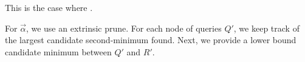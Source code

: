 \documentclass{article}
\newtheorem{theorem}{Theorem}
\newtheorem{definition} {Definition}
\newcommand{\GNP}[1][\psi]{{#1}_{\Theta}}
\newcommand{\vecalpha}{\vec{\alpha}}
\begin{document}
\noindent This is the case where .

For $\vecalpha$, we use an extrinsic prune.
For each node of queries $Q'$, we keep track of the largest candidate second-minimum found.
Next, we provide a lower bound candidate minimum between $Q'$ and $R'$.


\appendix

% 
% 
% 
\end{document}
